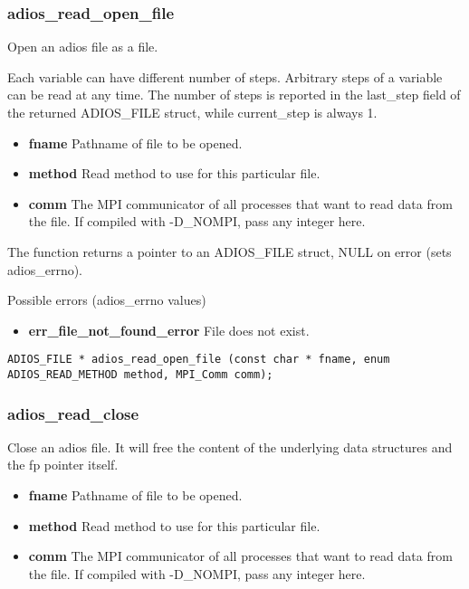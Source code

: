 \subsubsection*{adios\_read\_open\_file}
Open an adios file as a file.

Each variable can have different number of steps. Arbitrary steps of a variable
can be read at any time. The number of steps is reported in the last\_step 
field of the returned ADIOS\_FILE struct, while current\_step is always 1.

\begin{itemize}
\item{\bf fname}    Pathname of file to be opened.
\item{\bf method}   Read method to use for this particular file.
\item{\bf comm}     The MPI communicator of all processes that want to read data from the file. If compiled with -D\_NOMPI, pass any integer here.
\end{itemize}

The function returns a pointer to an ADIOS\_FILE struct, NULL on error (sets adios\_errno). 

Possible errors (adios\_errno values)
\begin{itemize}
\item{\bf err\_file\_not\_found\_error}  File does not exist. 
\end{itemize}

\begin{lstlisting}[language=ADIOS]
ADIOS_FILE * adios_read_open_file (const char * fname, enum ADIOS_READ_METHOD method, MPI_Comm comm);
\end{lstlisting}

\subsubsection*{adios\_read\_close}
Close an adios file. It will free the content of the underlying data structures and the fp pointer itself.

\begin{itemize}
\item{\bf fname}    Pathname of file to be opened.
\item{\bf method} Read method to use for this particular file.
\item{\bf comm}  The MPI communicator of all processes that want to read data from the file. 
	If compiled with -D\_NOMPI, pass any integer here.
\end{itemize}

